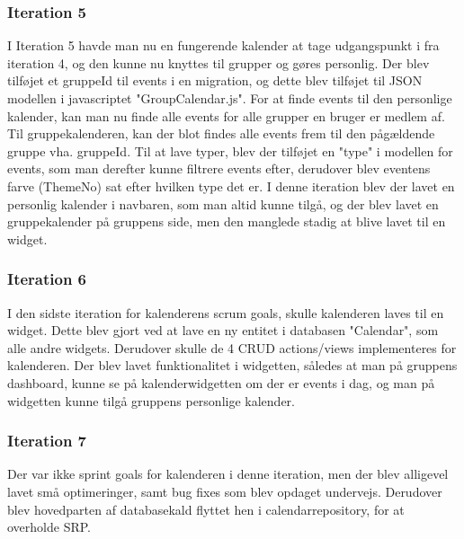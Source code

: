 \subsubsection{Iteration 5}
I Iteration 5 havde man nu en fungerende kalender at tage udgangspunkt i fra iteration 4, og den kunne nu knyttes til grupper og gøres personlig.
Der blev tilføjet et gruppeId til events i en migration, og dette blev tilføjet til JSON modellen i javascriptet "GroupCalendar.js". For at finde events til den personlige kalender, kan man nu finde alle events for alle grupper en bruger er medlem af. Til gruppekalenderen, kan der blot findes alle events frem til den pågældende gruppe vha. gruppeId.
Til at lave typer, blev der tilføjet en "type" i modellen for events, som man derefter kunne filtrere events efter, derudover blev eventens farve (ThemeNo) sat efter hvilken type det er. 
I denne iteration blev der lavet en personlig kalender i navbaren, som man altid kunne tilgå, og der blev lavet en gruppekalender på gruppens side, men den manglede stadig at blive lavet til en widget.

\subsubsection{Iteration 6}
I den sidste iteration for kalenderens scrum goals, skulle kalenderen laves til en widget. Dette blev gjort ved at lave en ny entitet i databasen "Calendar", som alle andre widgets. Derudover skulle de 4 CRUD actions/views implementeres for kalenderen. Der blev lavet funktionalitet i widgetten, således at man på gruppens dashboard, kunne se på kalenderwidgetten om der er events i dag, og man på widgetten kunne tilgå gruppens personlige kalender.

\subsubsection{Iteration 7}
Der var ikke sprint goals for kalenderen i denne iteration, men der blev alligevel lavet små optimeringer, samt bug fixes som blev opdaget undervejs. Derudover blev hovedparten af databasekald flyttet hen i calendarrepository, for at overholde SRP.